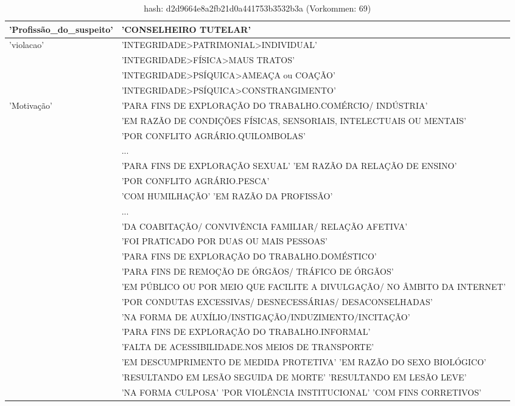 \documentclass[12pt]{report}
\begin{document}
	\begin {table}[ht] %
		\caption {hash: d2d9664e8a2fb21d0a441753b3532b3a (Vorkommen: 69)} \label{tab:gleicher-hash} 
		\centering
		\small
		\begin{tabular}{|l|l|}
		\hline
		'Profissão\_do\_suspeito' & 'CONSELHEIRO TUTELAR'\\
		\hline
		'violacao' & 'INTEGRIDADE>PATRIMONIAL>INDIVIDUAL'\\
		~ & 'INTEGRIDADE>FÍSICA>MAUS TRATOS'\\
		~ & 'INTEGRIDADE>PSÍQUICA>AMEAÇA ou COAÇÃO'\\
		~ & 'INTEGRIDADE>PSÍQUICA>CONSTRANGIMENTO' \\
		\hline
		'Motivação' & 'PARA FINS DE EXPLORAÇÃO DO TRABALHO.COMÉRCIO/ INDÚSTRIA'\\
		~ & 'EM RAZÃO DE CONDIÇÕES FÍSICAS, SENSORIAIS, INTELECTUAIS OU MENTAIS'\\
		~ & 'POR CONFLITO AGRÁRIO.QUILOMBOLAS'\\
		~ & ... \\
		~ & 'PARA FINS DE EXPLORAÇÃO SEXUAL' 'EM RAZÃO DA RELAÇÃO DE ENSINO'\\
		~ & 'POR CONFLITO AGRÁRIO.PESCA'\\
		~ & 'COM HUMILHAÇÃO' 'EM RAZÃO DA PROFISSÃO'\\
		~ & ...\\
		~ & 'DA COABITAÇÃO/ CONVIVÊNCIA FAMILIAR/ RELAÇÃO AFETIVA'\\
		~ & 'FOI PRATICADO POR DUAS OU MAIS PESSOAS'\\
		~ & 'PARA FINS DE EXPLORAÇÃO DO TRABALHO.DOMÉSTICO'\\
		~ & 'PARA FINS DE REMOÇÃO DE ÓRGÃOS/ TRÁFICO DE ÓRGÃOS'\\
		~ & 'EM PÚBLICO OU POR MEIO QUE FACILITE A DIVULGAÇÃO/ NO ÂMBITO DA INTERNET'\\
		~ & 'POR CONDUTAS EXCESSIVAS/ DESNECESSÁRIAS/ DESACONSELHADAS'\\
		~ & 'NA FORMA DE AUXÍLIO/INSTIGAÇÃO/INDUZIMENTO/INCITAÇÃO'\\
		~ & 'PARA FINS DE EXPLORAÇÃO DO TRABALHO.INFORMAL'\\
		~ & 'FALTA DE ACESSIBILIDADE.NOS MEIOS DE TRANSPORTE'\\
		~ & 'EM DESCUMPRIMENTO DE MEDIDA PROTETIVA' 'EM RAZÃO DO SEXO BIOLÓGICO'\\
		~ & 'RESULTANDO EM LESÃO SEGUIDA DE MORTE' 'RESULTANDO EM LESÃO LEVE'\\
		~ & 'NA FORMA CULPOSA' 'POR VIOLÊNCIA INSTITUCIONAL' 'COM FINS CORRETIVOS'\\

\end{tabular}
\end{table}
\end{document}

